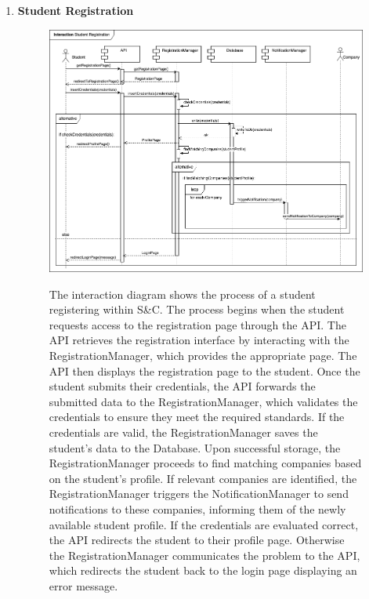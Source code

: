 \begin{enumerate}
    \newpage
    \item \textbf{Student Registration}
    \begin{figure}[h!]
            \centering  \includegraphics[width=1\textwidth]{DD/Images/Interactions/INT04_StudentRegistration.drawio.png}
            \label{fig:ComponentViewDiagram}
            \caption*{The interaction diagram shows the process of a student registering within S\&C. The process begins when the student requests access to the registration page through the API. The API retrieves the registration interface by interacting with the RegistrationManager, which provides the appropriate page. The API then displays the registration page to the student. Once the student submits their credentials, the API forwards the submitted data to the RegistrationManager, which validates the credentials to ensure they meet the required standards. If the credentials are valid, the RegistrationManager saves the student’s data to the Database. Upon successful storage, the RegistrationManager proceeds to find matching companies based on the student’s profile. If relevant companies are identified, the RegistrationManager triggers the NotificationManager to send notifications to these companies, informing them of the newly available student profile. If the credentials are evaluated correct, the API redirects the student to their profile page. Otherwise the RegistrationManager communicates the problem to the API, which redirects the student back to the login page displaying an error message.
            }
    \end{figure}


\end{enumerate}
